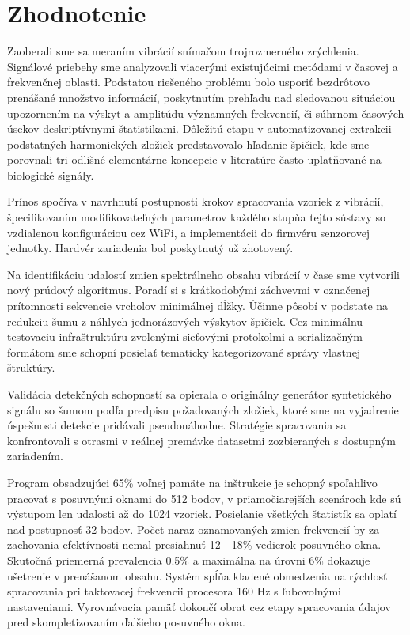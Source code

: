 \chapter{Zhodnotenie} \label{chapter:evaluation}
Zaoberali sme sa meraním vibrácií snímačom trojrozmerného zrýchlenia.
Signálové priebehy sme analyzovali viacerými existujúcimi metódami v časovej a frekvenčnej oblasti.
Podstatou riešeného problému bolo usporiť bezdrôtovo prenášané množstvo informácií, poskytnutím
prehľadu nad sledovanou situáciou upozornením na výskyt a amplitúdu významných frekvencií, či súhrnom
časových úsekov deskriptívnymi štatistikami. Dôležitú etapu v automatizovanej extrakcii
podstatných harmonických zložiek predstavovalo hľadanie špičiek, kde sme porovnali tri odlišné
elementárne koncepcie v literatúre často uplatňované na biologické signály.

Prínos spočíva v navrhnutí postupnosti krokov spracovania vzoriek z vibrácií, špecifikovaním
modifikovateľných parametrov každého stupňa tejto sústavy so vzdialenou konfiguráciou cez WiFi,
a implementácii do firmvéru senzorovej jednotky. Hardvér zariadenia bol poskytnutý už zhotovený.

Na identifikáciu udalostí zmien spektrálneho obsahu vibrácií v čase sme vytvorili nový prúdový algoritmus.
Poradí si s krátkodobými záchvevmi v označenej prítomnosti sekvencie vrcholov minimálnej dĺžky. Účinne pôsobí
v podstate na redukciu šumu z náhlych jednorázových výskytov špičiek. Cez minimálnu testovaciu infraštruktúru
zvolenými sieťovými protokolmi a serializačným formátom sme schopní posielať tematicky kategorizované správy vlastnej
štruktúry.

Validácia detekčných schopností sa opierala o originálny generátor syntetického signálu so šumom podľa
predpisu požadovaných zložiek, ktoré sme na vyjadrenie úspešnosti detekcie pridávali pseudonáhodne.
Stratégie spracovania sa konfrontovali s otrasmi v reálnej premávke datasetmi
zozbieraných s dostupným zariadením.

Program obsadzujúci 65\% voľnej pamäte na inštrukcie je schopný spoľahlivo pracovať s posuvnými
oknami do 512 bodov, v priamočiarejších scenároch kde sú výstupom len udalosti až do 1024 vzoriek.
Posielanie všetkých štatistík sa oplatí nad postupnosť 32 bodov. Počet naraz oznamovaných
zmien frekvencií by za zachovania efektívnosti nemal presiahnuť 12 - 18\% vedierok posuvného
okna. Skutočná priemerná prevalencia 0.5\% a maximálna na úrovni 6\% dokazuje ušetrenie v prenášanom obsahu.
Systém spĺňa kladené obmedzenia na rýchlosť spracovania pri taktovacej frekvencii procesora 160 Hz s ľubovoľnými
nastaveniami. Vyrovnávacia pamäť dokončí obrat cez etapy spracovania údajov pred skompletizovaním ďalšieho posuvného okna.

